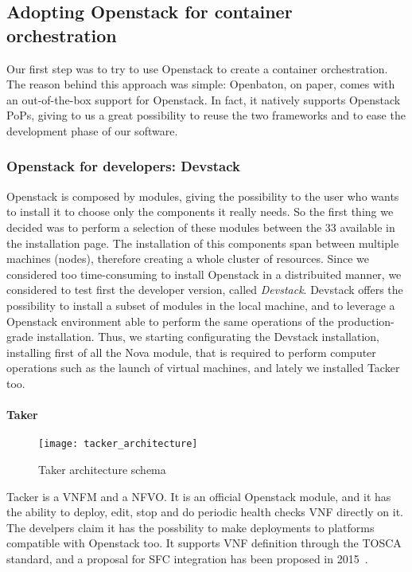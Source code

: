 \subsection{Adopting Openstack for container orchestration}

Our first step was to try to use Openstack to create a container orchestration. 
The reason behind this approach was simple: Openbaton, on paper, comes with an 
out-of-the-box support for Openstack. In fact, it natively supports Openstack 
PoPs, giving to us a great possibility to reuse the two frameworks and to ease 
the development phase of our software.
\subsubsection{Openstack for developers: Devstack}
Openstack is composed by modules, giving the possibility to the user who wants 
to install it to choose only the components it really needs. So the first thing 
we decided was to perform a selection of these modules between the 33 available 
in the installation page. The installation of this components span between 
multiple machines (nodes), therefore creating a whole cluster of resources. 
Since we considered too time-consuming to install Openstack in a distribuited 
manner, we considered to test first the developer version, called 
\emph{Devstack}. Devstack offers the possibility to install a subset of modules 
in the local machine, and to leverage a Openstack environment able to perform 
the same operations of the production-grade installation. Thus, we starting 
configurating the Devstack installation, installing first of all the Nova 
module, that is required to perform computer operations such as the launch of 
virtual machines, and lately we installed Tacker too.

\paragraph*{Taker}
\begin{figure}[t]
  \centering
  \texttt{[image: tacker\_architecture]}
  \caption[Taker architecture schema]{Taker architecture
    schema~\cite{tackerOpenstackwiki}}
\end{figure}
Tacker is a VNFM and a NFVO. It is an official Openstack module, and it has the
ability to deploy, edit, stop and do periodic health checks VNF directly on it.
The develpers claim it has the possbility to make deployments to platforms
compatible with Openstack too. It supports VNF definition through the TOSCA
standard, and a proposal for SFC integration has been proposed in
2015~\cite{tackerOpenstackwiki}.

